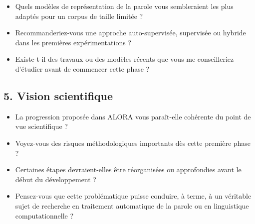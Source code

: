 \begin{discussion}

\begin{itemize}

\item Quels modèles de représentation de la parole vous sembleraient les
plus adaptés pour un corpus de taille limitée ?

\item Recommanderiez-vous une approche auto-supervisée, supervisée ou
hybride dans les premières expérimentations ?

\item Existe-t-il des travaux ou des modèles récents que vous me
conseilleriez d'étudier avant de commencer cette phase ?

\end{itemize}

\end{discussion}


\subsection{5. Vision scientifique}

\begin{discussion}

\begin{itemize}

\item La progression proposée dans ALORA vous paraît-elle cohérente du
point de vue scientifique ?

\item Voyez-vous des risques méthodologiques importants dès cette
première phase ?

\item Certaines étapes devraient-elles être réorganisées ou approfondies
avant le début du développement ?

\item Pensez-vous que cette problématique puisse conduire, à terme, à un
véritable sujet de recherche en traitement automatique de la parole ou
en linguistique computationnelle ?

\end{itemize}

\end{discussion}


